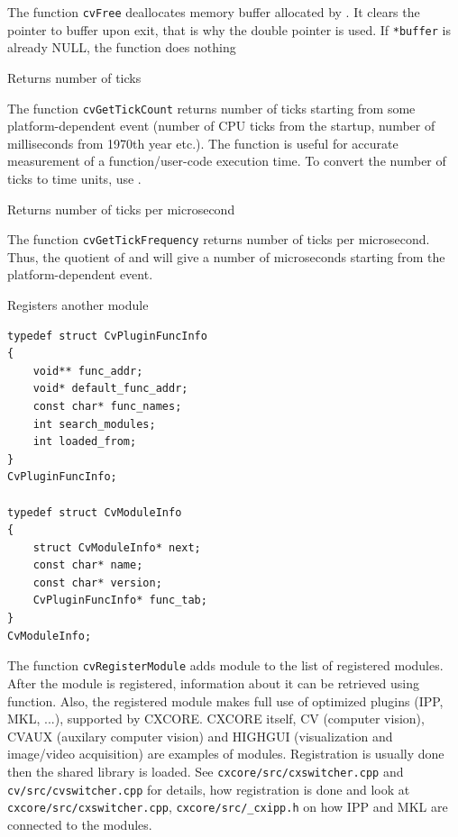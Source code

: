 The function \texttt{cvFree} deallocates memory buffer allocated by
. It clears the pointer to buffer upon exit, that is why
the double pointer is used. If \texttt{*buffer} is already NULL, the function
does nothing

\label{GetTickCount}

Returns number of ticks


The function \texttt{cvGetTickCount} returns number of ticks starting from some platform-dependent event (number of CPU ticks from the startup, number of milliseconds from 1970th year etc.). The function is useful for accurate measurement of a function/user-code execution time. To convert the number of ticks to time units, use .

\label{GetTickFrequency}

Returns number of ticks per microsecond


The function \texttt{cvGetTickFrequency} returns number of ticks per microsecond. Thus, the quotient of  and  will give a number of microseconds starting from the platform-dependent event.

\label{RegisterModule}

Registers another module

\begin{lstlisting}
typedef struct CvPluginFuncInfo
{
    void** func_addr;
    void* default_func_addr;
    const char* func_names;
    int search_modules;
    int loaded_from;
}
CvPluginFuncInfo;

typedef struct CvModuleInfo
{
    struct CvModuleInfo* next;
    const char* name;
    const char* version;
    CvPluginFuncInfo* func_tab;
}
CvModuleInfo;
\end{lstlisting}


\begin{description}
\end{description}

The function \texttt{cvRegisterModule} adds module to the list of
registered modules. After the module is registered, information about
it can be retrieved using  function. Also, the
registered module makes full use of optimized plugins (IPP, MKL, ...),
supported by CXCORE. CXCORE itself, CV (computer vision), CVAUX (auxilary
computer vision) and HIGHGUI (visualization and image/video acquisition) are
examples of modules. Registration is usually done then the shared library
is loaded. See \texttt{cxcore/src/cxswitcher.cpp} and
\texttt{cv/src/cvswitcher.cpp} for details, how registration is done
and look at \texttt{cxcore/src/cxswitcher.cpp}, \texttt{cxcore/src/\_cxipp.h}
on how IPP and MKL are connected to the modules.

